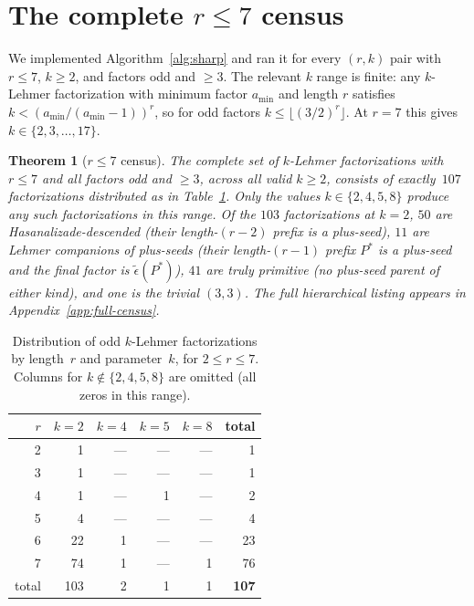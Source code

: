 \documentclass[11pt]{article}
\newtheorem{theorem}{Theorem}
\theoremstyle{definition}
\theoremstyle{remark}
\newcommand{\eps}{\tilde{\epsilon}}
\begin{document}
\section{The complete $r \le 7$ census}\label{sec:census}

We implemented Algorithm~\ref{alg:sharp} and ran it for every
$(r, k)$ pair with $r \le 7$, $k \ge 2$, and factors odd and $\ge 3$.
The relevant $k$ range is finite: any $k$-Lehmer factorization with
minimum factor $a_{\min}$ and length $r$ satisfies
$k < (a_{\min} / (a_{\min} - 1))^r$, so for odd factors
$k \le \lfloor (3/2)^r \rfloor$.  At $r = 7$ this gives
$k \in \{2, 3, \ldots, 17\}$.

\begin{theorem}[$r \le 7$ census]\label{thm:census}
The complete set of $k$-Lehmer factorizations with $r \le 7$ and all
factors odd and $\ge 3$, across all valid $k \ge 2$, consists of
exactly~$107$ factorizations distributed as in
Table~\ref{tab:census-distribution}.  Only the values $k \in \{2, 4,
5, 8\}$ produce any such factorizations in this range.  Of the $103$
factorizations at $k = 2$, $50$ are Hasanalizade-descended (their
length-$(r-2)$ prefix is a plus-seed), $11$ are Lehmer companions of
plus-seeds (their length-$(r-1)$ prefix $P^*$ is a plus-seed and the
final factor is $\eps(P^*)$), $41$ are truly primitive (no plus-seed
parent of either kind), and one is the trivial $(3, 3)$.  The full
hierarchical listing appears in Appendix~\ref{app:full-census}.
\end{theorem}

\begin{table}[ht]
\centering
\caption{Distribution of odd $k$-Lehmer factorizations by length~$r$
and parameter~$k$, for $2 \le r \le 7$.  Columns for $k \notin
\{2,4,5,8\}$ are omitted (all zeros in this range).}
\label{tab:census-distribution}
\smallskip
\begin{tabular}{@{}rrrrrr@{}}
\toprule
$r$ & $k=2$ & $k=4$ & $k=5$ & $k=8$ & total \\
\midrule
2 & 1   & --- & --- & --- & 1 \\
3 & 1   & --- & --- & --- & 1 \\
4 & 1   & --- & 1   & --- & 2 \\
5 & 4   & --- & --- & --- & 4 \\
6 & 22  & 1   & --- & --- & 23 \\
7 & 74  & 1   & --- & 1   & 76 \\
\midrule
total & 103 & 2 & 1 & 1 & \textbf{107} \\
\bottomrule
\end{tabular}
\end{table}
\end{document}
